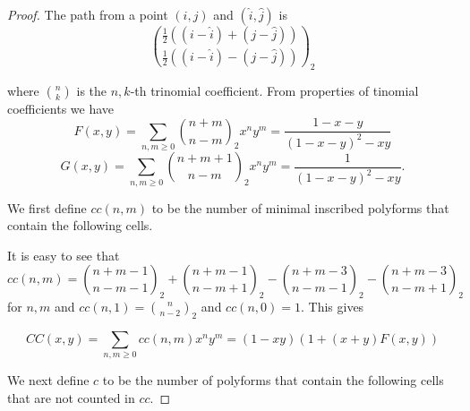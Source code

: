 \documentclass[12pt]{article}
\theoremstyle{plain}
\theoremstyle{definition}
\theoremstyle{remark}
\theoremstyle{definition}
\newcommand{\cellw}[4]{\draw[thick] ( #1 , #2 ) rectangle ( #3 , #4 );}
\newcommand{\cellb}[4]{\filldraw[black!60] ( #1 , #2 ) rectangle ( #3 , #4 ); \draw[thick] ( #1 , #2 ) rectangle ( #3 , #4 );}
\begin{document}
\begin{proof}
The path from a point $(i,j)$ and $(\hat{i},\hat{j})$ is
$$\binom{\frac{1}{2}((i-\hat{i})+(j-\hat{j}))}{\frac{1}{2}((i-\hat{i})-(j-\hat{j}))}_2$$

where $\binom{n}{k}$ is the $n,k$-th trinomial coefficient. From properties of tinomial coefficients we have 
$$F(x,y)=\sum_{n,m\geq 0}\binom{n+m}{n-m}_2 x^n y^m = \frac{1-x-y}{(1-x-y)^2 -xy}$$
$$G(x,y)=\sum_{n,m\geq 0}\binom{n+m+1}{n-m}_2 x^n y^m = \frac{1}{(1-x-y)^2 -xy}.$$

We first define $cc(n,m)$ to be the number of minimal inscribed polyforms that contain the following cells.

\begin{center}
\end{center}

It is easy to see that $$cc(n,m)=\binom{n+m-1}{n-m-1}_2 +\binom{n+m-1}{n-m+1}_2 -\binom{n+m-3}{n-m-1}_2 -\binom{n+m-3}{n-m+1}_2$$
for $n,m$ and $cc(n,1)=\binom{n}{n-2}_2$ and $cc(n,0)=1$. This gives

$$CC(x,y)=\sum_{n,m\geq 0}cc(n,m)x^n y^m = (1-xy)(1+(x+y)F(x,y))$$

We next define $c$ to be the number of polyforms that contain the following cells that are not counted in $cc$.


\end{proof}
\end{document}
